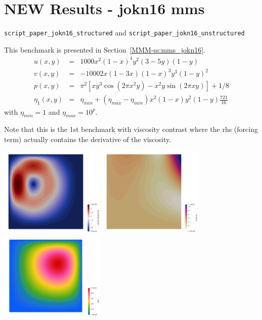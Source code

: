 \newpage
\section*{NEW Results - jokn16 mms}

{\tt script\_paper\_jokn16\_structured} and {\tt script\_paper\_jokn16\_unstructured}

This benchmark is presented in Section~\ref{MMM-ss:mms_jokn16}.
\begin{eqnarray}
u(x,y) &=&  1000 x^2(1-x)^4  y^2 (3-5y) (1-y) \nonumber\\
v(x,y) &=& -1000 2x(1-3x) (1-x)^3  y^3(1-y)^2 \nonumber\\
p(x,y) &=& \pi^2 [xy^3 \cos(2\pi x^2 y) - x^2y \sin(2\pi xy) ]+1/8 \nonumber\\
\eta_1(x,y) &=& \eta_{min}+(\eta_{max}-\eta_{min}) x^2 (1-x)y^2(1-y)\frac{721}{16} 
\nonumber
\end{eqnarray}
with $\eta_{min}=1$ and $\eta_{max}=10^p$.

Note that this is the 1st benchmark with viscosity contrast where the 
rhs (forcing term) actually contains the derivative of the viscosity.

\begin{center}
\includegraphics[width=5cm]{python_codes/fieldstone_120/images/jokn16_vel}
\includegraphics[width=5cm]{python_codes/fieldstone_120/images/jokn16_press}
\includegraphics[width=5cm]{python_codes/fieldstone_120/images/jokn16_eta}
\end{center}

